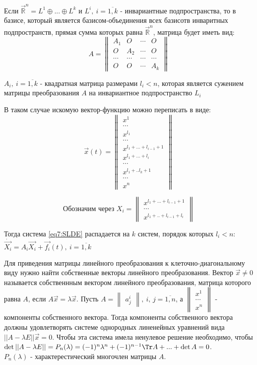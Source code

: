 Если $\vec{\mathbb{R}}^n = L^1 \oplus ... \oplus L^k$ и $L^i, ~i = \overline{1, k}$ - инвариантные подпространства, то в базисе, который является базисом-объединения всех базисотв инваритных подпространств, прямая сумма которых равна $\vec{\mathbb{R}}^n$, матрица будет иметь вид:
\[A = \begin{Vmatrix} A_1 & O & \cdots & O \\ O & A_2 & \cdots & O \\ \cdots & \cdots & \cdots & \cdots \\ O & O &\cdots & A_k \end{Vmatrix} \] 

$A_i, ~i = \overline{1, k}$ - квадратная матрица размерами $l_i < n$, которая является сужением матрицы преобразования $A$ на инвариантное подпространство $L_i$

В таком случае искомую вектор-функцию можно переписать в виде: 
\[ \vec{x}(t) = \begin{Vmatrix} x^1 \\ \cdots \\ x^{l_1} \\ \cdots \\ x^{l_1 + ... + l_{i-1} + 1} \\ x^{l_1 + ... + l_{i}} \\ \cdots \\ x^{l_1 + .. l_k + 1} \\ \cdots \\ x^n \end{Vmatrix}\]

\[\text{Обозначим через } X_i = \begin{Vmatrix} x^{l_1 + ... + l_{i-1} + 1} \\ \cdots \\ x^{l_1 + .. + l_{i-1} + l_{i}}\end{Vmatrix} \]

Тогда система \eqref{eq7:SLDE} распадается на $k$ систем, порядок которых $l_i < n$: \\
$\dot{\vec{X_i}} = A_i \vec{X_i} + \vec{f_i}(t), ~i =\overline{1, k}$

Для приведения матрицы линейного преобразования к клеточно-диагональному виду нужно найти собственные векторы линейного преобразования. 
Вектор $\vec{x} \neq 0$ называется собственнным вектором линейного преобразования, матрица которого равна $A$, если $A\vec{x} = \lambda \vec{x}$. 
Пусть $A = \begin{Vmatrix} a_j^i \end{Vmatrix}, ~i,\,j = \overline{1, n}$, а $\begin{Vmatrix} x^1 \\ \cdots \\ x^n \end{Vmatrix}$ - компоненты собственного вектора.
Тогда компоненты собственного вектора должны удовлетворять системе однородных линенейных уравнений вида $|| A - \lambda E|| \vec{x} = 0$. 
Чтобы эта система имела ненулевое решение необходимо, чтобы $\det || A - \lambda E|| = P_n(\lambda) = (-1)^n \lambda^n + (-1)^{n-1} \Tr A + ... + \det A = 0$. \\
$P_n(\lambda)$ - характерестический многочлен матрицы $A$. 

